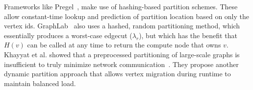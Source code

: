 Frameworks like Pregel~\cite{Malpregel}, make use of hashing-based partition schemes.
These allow constant-time lookup and prediction of partition location based on only the vertex ids.
GraphLab~\cite{Low:2012:DGF:2212351.2212354} also uses a hashed, random partitioning method, which essentially produces a worst-case edgecut ($\lambda_r$), but which has the benefit that $H(v)$ can be called at any time to return the compute node that owns $v$. Khayyat et al. showed that a preprocessed partitioning of large-scale graphs is insufficient to truly minimize network communication~\cite{khayyatmizan}. They propose another dynamic partition approach that allows vertex migration during runtime to maintain balanced load.






